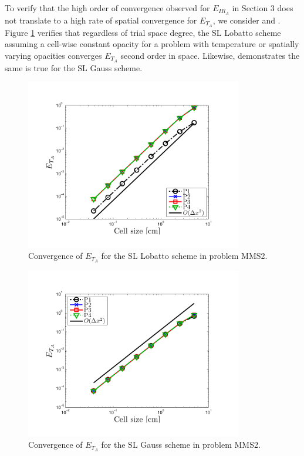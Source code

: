 To verify that the high order of convergence observed for $E_{IR_A}$ in Section 3 does not translate to a high rate of spatial convergence for $E_{T_A}$, we consider  and .
Figure \ref{fig:mms3_constant_lobatto_temp_A} verifies that regardless of trial space degree, the SL Lobatto scheme assuming a cell-wise constant opacity for a problem with temperature or spatially varying opacities converges $E_{T_A}$ second order in space.
Likewise,  demonstrates the same is true for the SL Gauss scheme.
\pagebreak
\begin{figure}[!htp]
\centering
\includegraphics[width=9.5cm,trim=0.25in  0.2in 0.75in 0.5in,clip=true]{chapter6_grey_radtran/Dissertation_Data/MMS3_Constant_XS_SL_Lobatto_temp_A.pdf}
\caption{Convergence of $E_{T_A}$ for the SL Lobatto scheme in problem MMS2.}
\label{fig:mms3_constant_lobatto_temp_A}
\end{figure}
%
%
\begin{figure}[!hbp]
\centering
\includegraphics[width=9.5cm,trim=0.25in  0.2in 0.75in 0.5in,clip=true]{chapter6_grey_radtran/Dissertation_Data/MMS3_Constant_XS_SL_Gauss_temp_A.pdf}
\caption{Convergence of $E_{T_A}$ for the SL Gauss scheme in problem MMS2.}
\label{fig:mms3_constant_gauss_temp_A}
\end{figure}
\pagebreak


